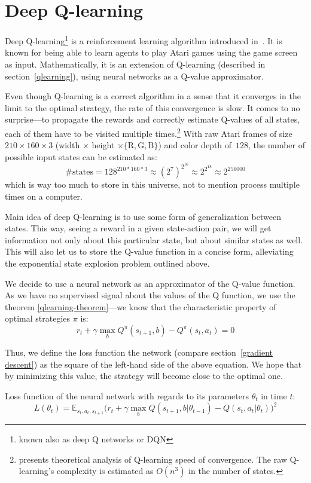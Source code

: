 \chapter{Deep Q-learning}\label{dqn}
Deep Q-learning\footnote{known also as deep Q networks or DQN} is a reinforcement learning algorithm introduced in~\cite{nips-dqn}. It is known for being able to learn agents to play Atari games using the game screen as input. Mathematically, it is an extension of Q-learning (described in section~\ref{qlearning}), using neural networks as a Q-value approximator.

Even though Q-learning is a correct algorithm in a sense that it converges in the limit to the optimal strategy, the rate of this convergence is slow. It comes to no surprise---to propagate the rewards and correctly estimate Q-values of all states, each of them have to be visited multiple times.\footnote{\cite{qlearning-complexity} presents theoretical analysis of Q-learning speed of convergence. The raw Q-learning's complexity is estimated as $O(n^3)$ in the number of states.}
With raw Atari frames of size~$210 \times 160 \times 3$ (width $\times$ height $\times \{\text{R}, \text{G}, \text{B}\}$) and color depth of~$128$, the number of possible input states can be estimated as:
\begin{equation}
  \mbox{\# states} = 128^{210*160*3} \approx (2^7)^{2^{16}} \approx 2^{2^{18}} \approx 2^{256000}
\end{equation}\label{number-frame-states}
which is way too much to store in this universe, not to mention process multiple times on a computer.

Main idea of deep Q-learning is to use some form of generalization between states. This way, seeing a reward in a given state-action pair, we will get information not only about this particular state, but about similar states as well. This will also let us to store the Q-value function in a concise form, alleviating the exponential state explosion problem outlined above.

We decide to use a neural network as an approximator of the Q-value function. As we have no supervised signal about the values of the Q function, we use the theorem \ref{qlearning-theorem}---we know that the characteristic property of optimal strategies $\pi$ is:
\begin{equation}
  r_t + \gamma \max_b Q^\pi(s_{t+1}, b) - Q^\pi(s_t, a_t) = 0
\end{equation}

Thus, we define the loss function the network (compare section~\ref{gradient descent}) as the square of the left-hand side of the above equation. We hope that by minimizing this value, the strategy will become close to the optimal one. 
\begin{definition}{Loss function} of the neural network with regards to its parameters $\theta_t$ in time $t$:
  \begin{equation}\label{dqn-loss}
    L(\theta_t) = \mathbb{E}_{s_t, a_t, s_{t+1}} \big(r_t + \gamma \max_b Q(s_{t+1}, b|\theta_{t-1}) - Q(s_t, a_t|\theta_t)\big)^2
  \end{equation}
\end{definition}

